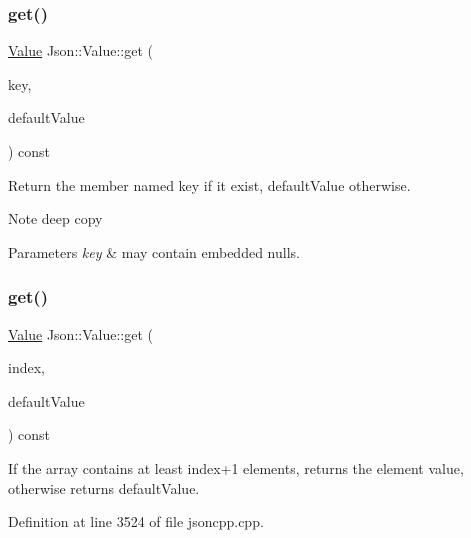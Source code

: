\subsubsection{\texorpdfstring{get()}{get()}\hspace{0.1cm}{\footnotesize\ttfamily [4/8]}}
{\footnotesize\ttfamily \hyperlink{class_json_1_1_value}{Value} Json\+::\+Value\+::get (\begin{DoxyParamCaption}\item[{const \hyperlink{config_8h_a1e723f95759de062585bc4a8fd3fa4be}{J\+S\+O\+N\+C\+P\+P\+\_\+\+S\+T\+R\+I\+NG} \&}]{key,  }\item[{const \hyperlink{class_json_1_1_value}{Value} \&}]{default\+Value }\end{DoxyParamCaption}) const}

Return the member named key if it exist, default\+Value otherwise. \begin{DoxyNote}{Note}
deep copy 
\end{DoxyNote}

\begin{DoxyParams}{Parameters}
{\em key} & may contain embedded nulls. \\
\hline
\end{DoxyParams}
\hypertarget{class_json_1_1_value_a034eb7bf85a44fa759bdaa232788ca66}{}\label{class_json_1_1_value_a034eb7bf85a44fa759bdaa232788ca66} 
\subsubsection{\texorpdfstring{get()}{get()}\hspace{0.1cm}{\footnotesize\ttfamily [5/8]}}
{\footnotesize\ttfamily \hyperlink{class_json_1_1_value}{Value} Json\+::\+Value\+::get (\begin{DoxyParamCaption}\item[{\hyperlink{class_json_1_1_value_a184a91566cccca7b819240f0d5561c7d}{Array\+Index}}]{index,  }\item[{const \hyperlink{class_json_1_1_value}{Value} \&}]{default\+Value }\end{DoxyParamCaption}) const}

If the array contains at least index+1 elements, returns the element value, otherwise returns default\+Value. 

Definition at line 3524 of file jsoncpp.\+cpp.

\hypertarget{class_json_1_1_value_a57de86629ed23246f14014fb6c44fa67}{}\label{class_json_1_1_value_a57de86629ed23246f14014fb6c44fa67} 

